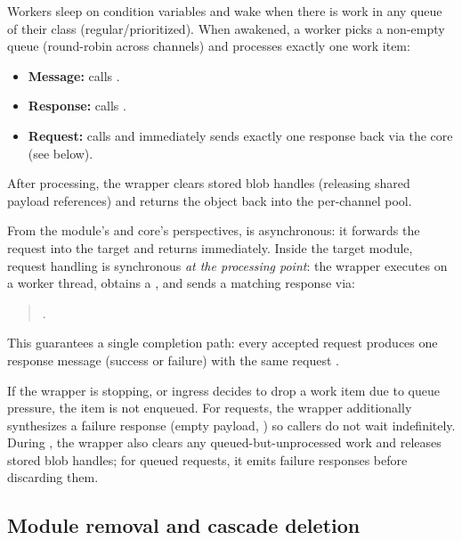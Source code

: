 Workers sleep on condition variables and wake when there is work in any queue of their class (regular/prioritized).
When awakened, a worker picks a non-empty queue (round-robin across channels) and processes exactly one work item:
\begin{itemize}
    \item \textbf{Message:} calls .
    \item \textbf{Response:} calls .
    \item \textbf{Request:} calls  and immediately sends exactly one response back via the core (see below).
\end{itemize}
After processing, the wrapper clears stored blob handles (releasing shared payload references) and returns the  object back into the per-channel pool.

From the module's and core's perspectives,  is asynchronous: it forwards the request into the target  and returns immediately.
Inside the target module, request handling is synchronous \emph{at the processing point}: the wrapper executes  on a worker thread, obtains a , and sends a matching response via:
\begin{quote}
.
\end{quote}
This guarantees a single completion path: every accepted request produces one response message (success or failure) with the same request .

If the wrapper is stopping, or ingress decides to drop a work item due to queue pressure, the item is not enqueued.
For requests, the wrapper additionally synthesizes a failure response (empty payload, ) so callers do not wait indefinitely.
During , the wrapper also clears any queued-but-unprocessed work and releases stored blob handles; for queued requests, it emits failure responses before discarding them.



\subsection{Module removal and cascade deletion} \label{subsec:ch3_core_removal}

